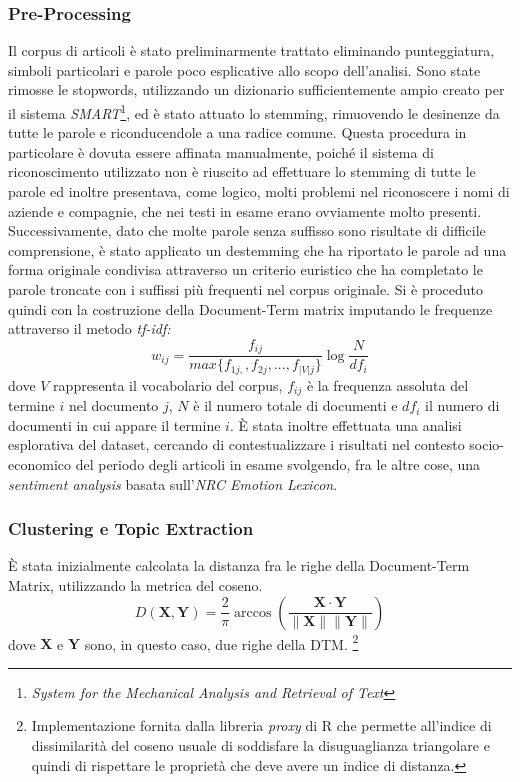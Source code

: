 \documentclass[]{article}
\begin{document}
\subsubsection{Pre-Processing}
Il corpus di articoli è stato preliminarmente trattato eliminando punteggiatura, simboli particolari e parole poco esplicative allo scopo dell'analisi. \newline 
Sono state rimosse le stopwords, utilizzando un dizionario sufficientemente ampio creato per il sistema \textit{SMART}\footnote{\textit{System for the Mechanical Analysis and Retrieval of Text}}, ed è stato attuato lo stemming, rimuovendo le desinenze da tutte le parole e riconducendole a una radice comune. Questa procedura in particolare è dovuta essere affinata manualmente, poiché il sistema di riconoscimento utilizzato non è riuscito ad effettuare lo stemming di tutte le parole ed inoltre presentava, come logico, molti problemi nel riconoscere i nomi di aziende e compagnie, che nei testi in esame erano ovviamente molto presenti. \newline
Successivamente, dato che molte parole senza suffisso sono risultate di difficile comprensione, è stato applicato un destemming che ha riportato le parole ad una forma originale condivisa attraverso un criterio euristico che ha completato le parole troncate con i suffissi più frequenti nel corpus originale. \newline
Si è proceduto quindi con la costruzione della Document-Term matrix imputando le frequenze attraverso il metodo \textit{tf-idf:}\[ w_{ij}=\frac{f_{ij}}{max\{{f_{1j,},f_{2j},...,f_{|V|j}}\}} \log{\frac{N}{df_{i}}}\]
dove $V$ rappresenta il vocabolario del corpus, $f_{ij}$ è la frequenza assoluta del termine $i$ nel documento $j$, $N$ è il numero totale di documenti e $df_{i}$ il numero di documenti in cui appare il termine $i$.
\newline
È stata inoltre effettuata una analisi esplorativa del dataset, cercando di contestualizzare i risultati nel contesto socio-economico del periodo degli articoli in esame svolgendo, fra le altre cose, una \textit{sentiment analysis} basata sull'\textit{NRC Emotion Lexicon}.\cite{NRC}
\subsubsection{Clustering e Topic Extraction}
È stata inizialmente calcolata la distanza fra le righe della Document-Term Matrix, utilizzando la metrica del coseno.
\[D(\mathbf{X}, \mathbf{Y}) = \frac{2}{\pi}\arccos(\frac{\mathbf{X}\cdot\mathbf{Y}}{\|\mathbf{X}\|\|\mathbf{Y}\|})\]
dove $\mathbf{X}$ e $\mathbf{Y}$ sono, in questo caso, due righe della DTM. \footnote{Implementazione fornita dalla libreria \textit{proxy} di R che permette all'indice di dissimilarità del coseno usuale di soddisfare la disuguaglianza triangolare e quindi di rispettare le proprietà che deve avere un indice di distanza.} \cite{proxy}
\end{document}
